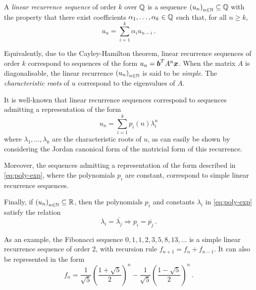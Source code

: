 \label{sec:LRS}

A \emph{linear recurrence sequence} of order $k$ over $\mathbb{Q}$ is a sequence ${(u_{n})}_{n \in \mathbb{N}} \subseteq \mathbb{Q}$ with the property that there exist coefficients $\alpha_{1}, \ldots, \alpha_{k} \in \mathbb{Q}$ such that, for all $n \geq k$,
\begin{equation*}
  u_{n} = \sum\limits_{i=1}^{k} \alpha_{i} u_{n-i}\, .
\end{equation*}

Equivalently, due to the Cayley-Hamilton theorem, linear recurrence sequences of order $k$ correspond to sequences of the form $u_{n} = \boldsymbol{b}^{T} A^{n} \boldsymbol{x}$. When the matrix $A$ is diagonalisable, the linear recurrence ${(u_{n})}_{n \in \mathbb{N}}$ is said to be \emph{simple}. The \emph{characteristic roots} of $u$ correspond to the eigenvalues of $A$.

It is well-known that linear recurrence sequences correspond to sequences admitting a representation of the form
\begin{equation}
  \label{eq:poly-exp}
  u_{n} = \sum\limits_{i=1}^{k} p_{i}(n) \lambda_{i}^{n}
\end{equation}
where $\lambda_{1}, \ldots, \lambda_{k}$ are the characteristic roots of $u$, as can easily be shown by considering the Jordan canonical form of the matricial form of this recurrence.

Moreover, the sequences admitting a representation of the form described in \cref{eq:poly-exp}, where the polynomials $p_{i}$ are constant, correspond to simple linear recurrence sequences.

Finally, if ${(u_{n})}_{n \in \mathbb{N}} \subseteq \mathbb{R}$, then the polynomials $p_{i}$ and constants $\lambda_{i}$ in \cref{eq:poly-exp} satisfy the relation
\begin{equation}
  \label{eq:real_property}
  \lambda_{i} = \overline{\lambda_{j}} \Rightarrow p_{i} = \overline{p_{j}} \, .
\end{equation}

As an example, the Fibonacci sequence $0, 1, 1, 2, 3, 5, 8, 13, \ldots$ is a simple linear recurrence sequence of order $2$, with recursion rule $f_{n+1} = f_{n} + f_{n-1}$. It can also be represented in the form
\begin{equation*}
  f_{n} = \frac{1}{\sqrt{5}} {\left(\frac{1+\sqrt{5}}{2} \right)}^{n} - \frac{1}{\sqrt{5}} {\left( \frac{1-\sqrt{5}}{2} \right)}^{n} \, .
\end{equation*}

